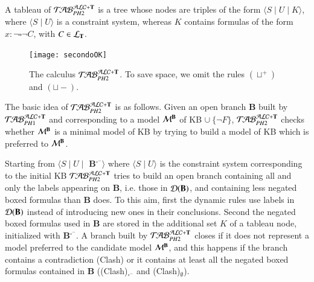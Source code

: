 \documentclass[a4paper, 11pt, oneside]{elsarticle}
\newcommand{\tip}{{\bf T}}
\newcommand{\hide}[1]{}
\newcommand{\unione} {\cup}
\newcommand{\vuoto} {\emptyset}
\newcommand{\nott} {\lnot}
\newcommand{\tc} {\mid}
\newcommand{\bbox}{\square}
\newcommand{\sx} {\langle}
\newcommand{\dx} {\rangle}
\newcommand{\db}{\mathcal{D}(\mbox{\bf B})}
\newcommand{\ellet} {\mathcal{L}_{\bf T}}
\newcommand{\emme} {\begin{mathcal}M\end{mathcal}}
\newcommand{\primo}{\mathrel{{\mathcal{T}\!\mathcal{AB}}}_{PH 1}^{\mathcal{ALC}+\mbox{\scriptsize $\tip$}}}
\newcommand{\secondo}{\mathrel{{\mathcal{T}\!\mathcal{AB}}}_{PH 2}^{\mathcal{ALC}+\mbox{\scriptsize $\tip$}}}
\begin{document}
\hide{\noindent Intuitively, $\db$ is the set of individual constants and variables occurring in {\bf B}, whereas {\bf B}$^{\bbox^{-}}$ is the set of formulas $x: \nott \bbox \nott C$ occurring in {\bf B}.}

\noindent  A tableau of $\secondo$ is a tree whose nodes are triples of the form $\sx S \tc U \tc K \dx$, where $\sx S \tc U \dx$ is a constraint system, whereas $K$ contains formulas of the form $x: \nott \bbox \nott C$, with $C \in \ellet$.

\begin{figure}[t]
{\centerline{
\texttt{[image: secondoOK]}} }
\caption{The calculus $\secondo$. To save space, we omit the rules $(\sqcup^+)$ and $(\sqcup-)$.}\label{immagine secondo}
\end{figure}




The basic idea of $\secondo$ is as follows. Given an open branch {\bf B} built by $\primo$ and corresponding to a model $\emme^{\bf B}$ of KB $\unione \ \{\nott F\}$, $\secondo$ checks whether $\emme^{\bf B}$ is a minimal model of KB by trying to build a model of KB which is preferred to $\emme^{\bf B}$.
\hide{Checking (un)satisfiability of , allows to verify whether the candidate model $\emme^{\bf B}$ is minimal.}
Starting from $\sx S \tc U \tc$ {\bf B}$^{\bbox^-} \dx$ where $\sx S \tc U \dx$ is the  constraint system corresponding to the initial KB $\secondo$ tries to build an open branch containing  all and only the labels appearing on {\bf B}, i.e. those in $\db$, and containing less negated boxed formulas than {\bf B} does.
To this aim, first the dynamic rules use labels in $\db$ instead of introducing new ones in their conclusions.
Second the negated boxed formulas used in {\bf B} are stored in  the additional set $K$ of a tableau node, initialized with {\bf B}$^{\bbox^-}$.
A branch built by $\secondo$ closes if it does not represent a model preferred to the candidate model $\emme^{\bf B}$, and this happens if the branch contains a contradiction (Clash) or it contains at least all the negated boxed formulas contained in {\bf B} ((Clash)$_{\bbox^{-}}$ and (Clash)$_{\vuoto}$).
\end{document}

